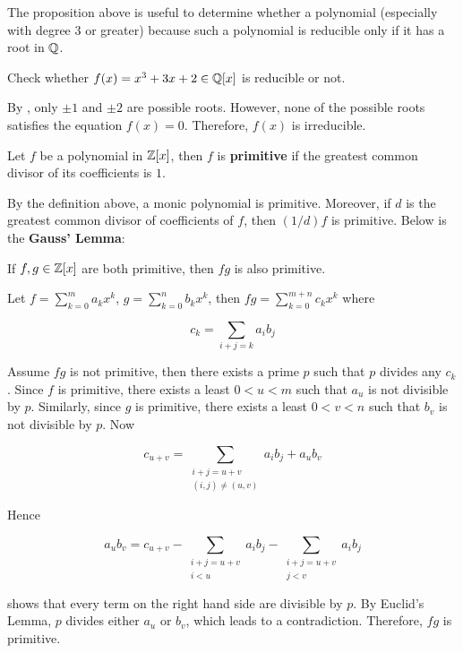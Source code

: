 \documentclass[a4paper,12pt]{article}
\begin{document}
The proposition above is useful to determine whether a polynomial (especially with degree $3$ or greater) because such a polynomial is reducible only if it has a root in $\mathbb{Q}$.\n

\begin{exm}
  Check whether $f(x)=x^{3}+3x+2\in\mathbb{Q}[x]$ is reducible or not.\n

  \ans By \rpst[\sctd{1}], only $\pm 1$ and $\pm 2$ are possible roots. However, none of the possible roots satisfies the equation $f(x)=0$. Therefore, $f(x)$ is irreducible.
\end{exm}\n

\begin{dft}
  Let $f$ be a polynomial in $\mathbb{Z}[x]$, then $f$ is \textbf{primitive} if the greatest common divisor of its coefficients is $1$.
\end{dft}\n

By the definition above, a monic polynomial is primitive. Moreover, if $d$ is the greatest common divisor of coefficients of $f$, then $(1/d)f$ is primitive. Below is the \textbf{Gauss' Lemma}:\n

\begin{pst}
  If $f,g\in\mathbb{Z}[x]$ are both primitive, then $fg$ is also primitive.\n

  \prf Let $f=\sum_{k=0}^{m}a_{k}x^{k}$, $g=\sum_{k=0}^{n}b_{k}x^{k}$, then $fg=\sum_{k=0}^{m+n}c_{k}x^{k}$ where

  $$c_{k}=\sum_{i+j=k}a_{i}b_{j}$$\s

  Assume $fg$ is not primitive, then there exists a prime $p$ such that $p$ divides any $c_{k}$. Since $f$ is primitive, there exists a least $0<u<m$ such that $a_{u}$ is not divisible by $p$. Similarly, since $g$ is primitive, there exists a least $0<v<n$ such that $b_{v}$ is not divisible by $p$. Now

  $$c_{u+v}=\sum_{\substack{i+j=u+v\\(i,j)\neq(u,v)}}a_{i}b_{j}+a_{u}b_{v}$$\s

  Hence

  $$a_{u}b_{v}=c_{u+v}-\sum_{\substack{i+j=u+v\\i<u}}a_{i}b_{j}-\sum_{\substack{i+j=u+v\\j<v}}a_{i}b_{j}$$\s

  shows that every term on the right hand side are divisible by $p$. By Euclid's Lemma, $p$ divides either $a_{u}$ or $b_{v}$, which leads to a contradiction. Therefore, $fg$ is primitive.
\end{pst}\n
\end{document}
